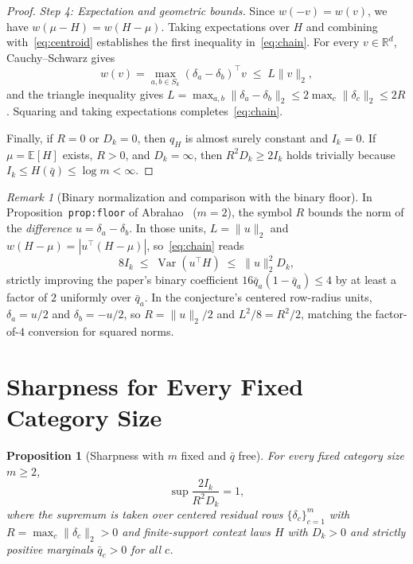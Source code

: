 \documentclass[11pt]{article}
\theoremstyle{plain}
\newtheorem{proposition}[theorem]{Proposition}
\theoremstyle{definition}
\theoremstyle{remark}
\newtheorem{remark}{Remark}
\DeclareMathOperator{\Var}{Var}
\begin{document}
\begin{proof}
\emph{Step 4: Expectation and geometric bounds.}
Since $w(-v) = w(v)$, we have $w(\mu - H) = w(H - \mu)$. Taking expectations over $H$ and combining with~\eqref{eq:centroid} establishes the first inequality in~\eqref{eq:chain}. For every $v \in \mathbb{R}^d$, Cauchy--Schwarz gives
\[
w(v) = \max_{a,b \in S_k} (\delta_a - \delta_b)^\top v \;\le\; L \|v\|_2,
\]
and the triangle inequality gives $L = \max_{a,b} \|\delta_a - \delta_b\|_2 \le 2\max_c \|\delta_c\|_2 \le 2R$. Squaring and taking expectations completes~\eqref{eq:chain}.

Finally, if $R = 0$ or $D_k = 0$, then $q_H$ is almost surely constant and $I_k = 0$. If $\mu = \mathbb{E}[H]$ exists, $R > 0$, and $D_k = \infty$, then $R^2 D_k \ge 2 I_k$ holds trivially because $I_k \le H(\bar{q}) \le \log m < \infty$.
\end{proof}

\begin{remark}[Binary normalization and comparison with the binary floor]
In Proposition~\texttt{prop:floor} of Abrahao~\cite{Abrahao2026} ($m = 2$), the symbol $R$ bounds the norm of the \emph{difference} $u = \delta_a - \delta_b$. In those units, $L = \|u\|_2$ and $w(H - \mu) = |u^\top(H - \mu)|$, so~\eqref{eq:chain} reads
\[
8 I_k \;\le\; \Var(u^\top H) \;\le\; \|u\|_2^2 D_k,
\]
strictly improving the paper's binary coefficient $16 \bar{q}_a(1 - \bar{q}_a) \le 4$ by at least a factor of $2$ uniformly over $\bar{q}_a$. In the conjecture's centered row-radius units, $\delta_a = u/2$ and $\delta_b = -u/2$, so $R = \|u\|_2/2$ and $L^2/8 = R^2/2$, matching the factor-of-$4$ conversion for squared norms.
\end{remark}

\section{Sharpness for Every Fixed Category Size}

\begin{proposition}[Sharpness with $m$ fixed and $\bar{q}$ free]\label{prop:sharp}
For every fixed category size $m \ge 2$,
\[
\sup \frac{2 I_k}{R^2 D_k} = 1,
\]
where the supremum is taken over centered residual rows $\{\delta_c\}_{c=1}^m$ with $R = \max_c \|\delta_c\|_2 > 0$ and finite-support context laws $H$ with $D_k > 0$ and strictly positive marginals $\bar{q}_c > 0$ for all $c$.
\end{proposition}
\end{document}

